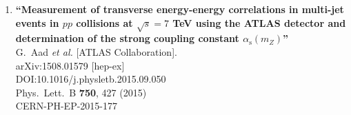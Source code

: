 \documentclass{article}
\begin{document}
\begin{enumerate}
\item%
{\bf ``Measurement of transverse energy-energy correlations in multi-jet events in $pp$ collisions at $\sqrt{s} = 7$ TeV using the ATLAS detector and determination of the strong coupling constant $\alpha_{\mathrm{s}}(m_Z)$''}
  \\{}G.~Aad {\it et al.} [ATLAS Collaboration].
  \\{}arXiv:1508.01579 [hep-ex]
  \\{}DOI:10.1016/j.physletb.2015.09.050
  \\{}Phys.\ Lett.\ B {\bf 750}, 427 (2015)
  \\{}CERN-PH-EP-2015-177

\end{enumerate}
\end{document}

